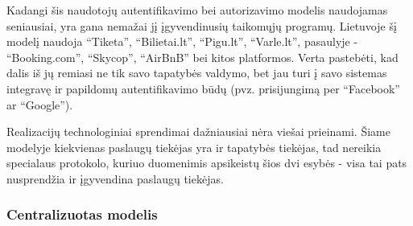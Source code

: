 Kadangi šis naudotojų autentifikavimo bei autorizavimo modelis naudojamas seniausiai,
yra gana nemažai jį įgyvendinusių taikomųjų programų. Lietuvoje šį modelį naudoja
\enquote{Tiketa}, \enquote{Bilietai.lt}, \enquote{Pigu.lt},
\enquote{Varle.lt}, pasaulyje - \enquote{Booking.com}, \enquote{Skycop}, \enquote{AirBnB} bei kitos platformos. Verta
pastebėti, kad dalis iš jų remiasi ne tik savo tapatybės valdymo, bet jau turi į savo sistemas integravę ir papildomų autentifikavimo būdų
(pvz. prisijungimą per \enquote{Facebook} ar \enquote{Google}).

Realizacijų technologiniai sprendimai dažniausiai nėra viešai prieinami.
Šiame modelyje kiekvienas paslaugų tiekėjas yra ir tapatybės tiekėjas, tad nereikia
specialaus protokolo, kuriuo duomenimis apsikeistų šios dvi esybės - visa tai pats nusprendžia
ir įgyvendina paslaugų tiekėjas.

\subsubsection{Centralizuotas modelis}